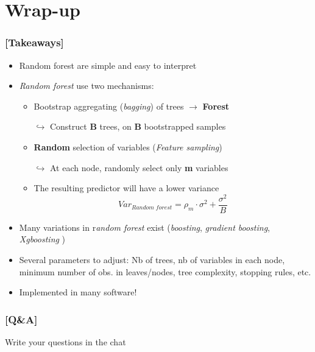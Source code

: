 \documentclass[xcolor=x11names,compress, aspectratio=169]{beamer}
\renewcommand{\(}{\begin{columns}}
\renewcommand{\)}{\end{columns}}
\newcommand{\<}[1]{\begin{column}{#1}}
\renewcommand{\>}{\end{column}}
\begin{document}
\section{Wrap-up}

\begin{frame} %
\frametitle{\textcolor{brique}{[Takeaways]}}
\begin{itemize}[<+->]
\item Random forest are simple and easy to interpret
\item\textit{Random forest} use two mechanisms: \\
\begin{itemize}[<+->]
    \item Bootstrap aggregating (\textit{bagging}) of trees $\rightarrow$ \textcolor{brique}{\textbf{Forest}}
    \item[$\hookrightarrow$] Construct \textbf{B} trees, on \textbf{B} bootstrapped samples
    \item \textcolor{brique}{\textbf{Random}} selection of variables (\textit{Feature sampling})
    \item[$\hookrightarrow$] At each node, randomly select only \textbf{m} variables
    \item The resulting predictor will have a lower variance
    $$
Var_{Random \; forest} = \rho_m \cdot \sigma^{2} + \frac{\sigma^{2}}{B}
$$
    \end{itemize}
\item Many variations in r\emph{andom forest} exist (\textit{boosting}, \textit{gradient boosting}, \textit{Xgboosting} )
\item Several parameters to adjust: Nb of trees,  nb of variables in each node, minimum number of obs. in leaves/nodes,  tree complexity, stopping rules, etc.
\item  Implemented in many software!
\end{itemize}
\end{frame}

\begin{frame} %
\frametitle{\textcolor{brique}{[Q\&A]}}
\begin{center}
\Large \textcolor{siap}{ Write your questions in the chat}
\end{center}
\end{frame}
\end{document}
